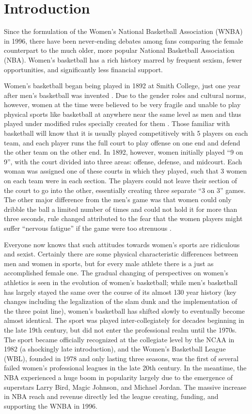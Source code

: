 \documentclass[12pt]{article}
\begin{document}
\section{Introduction}
Since the formulation of the Women’s National Basketball Association (WNBA) in 1996, there have been never-ending debates among fans comparing the female counterpart to the much older, more popular National Basketball Association (NBA). Women’s basketball has a rich history marred by frequent sexism, fewer opportunities, and significantly less financial support.
\par
Women’s basketball began being played in 1892 at Smith College, just one year after men’s basketball was invented \citep{Shattering_The_Glass}. Due to the gender roles and cultural norms, however, women at the time were believed to be very fragile and unable to play physical sports like basketball at anywhere near the same level as men and thus played under modified rules specially created for them \citep{WNBA_Hist}. Those familiar with basketball will know that it is usually played competitively with 5 players on each team, and each player runs the full court to play offense on one end and defend the other team on the other end. In 1892, however, women initially played “9 on 9”, with the court divided into three areas: offense, defense, and midcourt. Each woman was assigned one of these courts in which they played, such that 3 women on each team were in each section. The players could not leave their section of the court to go into the other, essentially creating three separate “3 on 3” games. The other major difference from the men’s game was that women could only dribble the ball a limited number of times and could not hold it for more than three seconds, rule changed attributed to the fear that the women players might suffer “nervous fatigue” if the game were too strenuous \citep{WNBA_Hist}.
\par
Everyone now knows that such attitudes towards women’s sports are ridiculous and sexist. Certainly there are some physical characteristic differences between men and women in sports, but for every male athlete there is a just as accomplished female one. The gradual changing of perspectives on women’s athletics is seen in the evolution of women’s basketball; while men’s basketball has largely stayed the same over the course of its almost 130 year history (key changes including the legalization of the slam dunk and the implementation of the three point line), women’s basketball has shifted slowly to eventually become almost identical. The sport was played inter-collegiately for decades beginning in the late 19th century, but did not enter the professional realm until the 1970s. The sport became officially recognized at the collegiate level by the NCAA in 1982 (a shockingly late introduction), and the Women’s Basketball League (WBL), founded in 1978 and only lasting three seasons, was the first of several failed women’s professional leagues in the late 20th century. In the meantime, the NBA experienced a huge boom in popularity largely due to the emergence of superstars Larry Bird, Magic Johnson, and Michael Jordan. The massive increase in NBA reach and revenue directly led the league creating, funding, and supporting the WNBA in 1996.
\end{document}
